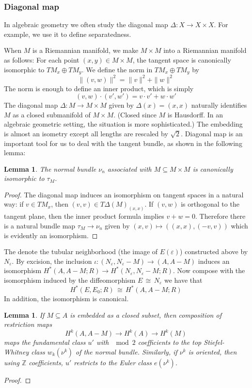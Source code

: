 \documentclass[12pt]{article}
\theoremstyle{plain}
\newtheorem{lemma}[equation]{Lemma}
\theoremstyle{definition}
\newcommand{\IZ}{\mathbb{Z}}
\newcommand\iso{\,{\cong}\,}
\newcommand{\<}{\langle}
\renewcommand{\>}{\rangle}
\newcommand{\sm}{\varepsilon}
\begin{document}
\subsubsection{Diagonal map}
In algebraic geometry we often study the diagonal map $\Delta : X \to X \times X$. For example, we use it to define separatedness. 

When $M$ is a Riemannian manifold, we make $M \times M$ into a Riemannian manifold as follows: For each point $(x, y) \in M \times M$, the tangent space is canonically isomorphic to $TM_x \oplus TM_y$. We define the norm in $TM_x \oplus TM_y$ by 
$$ \|(v, w)\|^2 = \|v\|^2 + \|w\|^2 $$
The norm is enough to define an inner product, which is simply
$$ (v, w) \cdot (v', w') = v \cdot v' + w \cdot w'$$
The diagonal map $\Delta : M \to M \times M$ given by $\Delta(x) = (x,x)$ naturally identifies $M$ as a closed submanifold of $M \times M$. (Closed since $M$ is Hausdorff. In an algebraic geometric setting, the situation is more sophisticated.) The embedding is almost an isometry except all lengths are rescaled by $\sqrt{2}$.   
Diagonal map is an important tool for us to deal with the tangent bundle, as shown in the following lemma:
\begin{lemma}
The normal bundle $\nu_n$ associated with $M \subseteq M \times M$ is canonically isomorphic to $\tau_M$. 
\end{lemma}
\begin{proof}
The diagonal map induces an isomorphism on tangent spaces in a natural way: if $v \in TM_x$, then $(v, v) \in T \Delta(M)_{(x, x)}$. If $(v, w)$ is orthogonal to the tangent plane, then the inner product formula implies $v + w = 0$. Therefore there is a natural bundle map $\tau_M \to \nu_n$ given by $(x, v) \mapsto ((x, x), (-v, v))$ which is evidently an isomorphism. 
\end{proof}


The denote the tubular neighborhood (the image of $E(\sm)$) constructed above by $N_\sm$. By excision, the inclusion $\iota : (N_\sm, N_\sm - M) \to (A, A - M)$ induces an isomorphism $H^*(A, A - M; R) \to H^*(N_\sm, N_\sm - M; R)$. Now compose with the isomorphism induced by the diffeomorphism $E \iso N_\sm$ we have that 
$$ H^*(E, E_0; R) \iso H^*(A, A - M; R) $$
In addition, the isomorphism is canonical.
\begin{lemma}
\label{normaltofund}
If $M \subseteq A$ is embedded as a closed subset, then composition of restriction maps 
$$ H^k(A, A - M) \to H^k(A) \to H^k(M)$$
maps the fundamental class $u'$ with $\mod 2$ coefficients to the top Stiefel-Whitney class $w_k(\nu^k)$ of the normal bundle. Similarly, if $\nu^k$ is oriented, then using $\IZ$ coefficients, $u'$ restricts to the Euler class $e(\nu^k)$. 
\end{lemma}
\begin{proof}

\end{proof}
\end{document}
